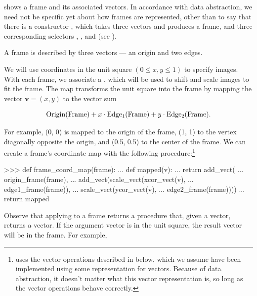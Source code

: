  shows a frame and its associated vectors.
In accordance with data abstraction, we need not be specific yet about how
frames are represented, other than to say that there is a constructor
, which takes three vectors and produces a frame, and three
corresponding selectors , , and
 (see ).

\begin{imageFigure}{A frame is described by three vectors --- an origin
  and two edges.}
  
\end{imageFigure}

We will use coordinates in the unit square \( (0 \le x, y \le 1) \) to specify
images.  With each frame, we associate a , which
will be used to shift and scale images to fit the frame.  The map transforms
the unit square into the frame by mapping the vector \( \mathbf{v} = (x, y) \)
to the vector sum

$$ {\rm Origin(Frame)} + x \cdot {\rm Edge_1(Frame)} + y \cdot {\rm
Edge_2(Frame)}. $$

\noindent
For example, (0, 0) is mapped to the origin of the frame, (1, 1) to the vertex
diagonally opposite the origin, and (0.5, 0.5) to the center of the frame.  We
can create a frame's coordinate map with the following
procedure:\footnote{ uses the vector operations
described in  below, which we assume have been implemented
using some representation for vectors.  Because of data abstraction, it doesn't
matter what this vector representation is, so long as the vector operations
behave correctly.}

\begin{codeBlock}
>>> def frame_coord_map(frame):
...     def mapped(v):
...         return add_vect(
...             origin_frame(frame),
...             add_vect(scale_vect(xcor_vect(v),
...                                 edge1_frame(frame)),
...                      scale_vect(ycor_vect(v),
...                                 edge2_frame(frame))))
...     return mapped
\end{codeBlock}

\noindent
Observe that applying  to a frame returns a procedure
that, given a vector, returns a vector.  If the argument vector is in the unit
square, the result vector will be in the frame.  For example,

